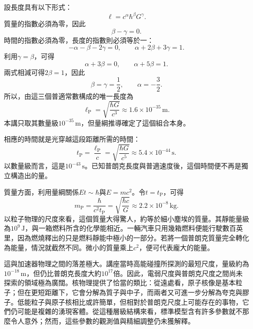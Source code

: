 設長度具有以下形式：
\begin{equation}
\ell=c^\alpha\hbar^\beta G^\gamma.
\label{eq:c10-length-ansatz}
\end{equation}
質量的指數必須為零，因此
\[
\beta-\gamma=0.
\]
時間的指數必須為零，長度的指數則必須等於一：
\[
-\alpha-\beta-2\gamma=0,
\qquad
\alpha+2\beta+3\gamma=1.
\]
利用\(\gamma=\beta\)，可得
\[
\alpha+3\beta=0,
\qquad
\alpha+5\beta=1.
\]
兩式相減可得\(2\beta=1\)，因此
\[
\beta=\gamma=\frac12,
\qquad
\alpha=-\frac32.
\]
所以，由這三個普適常數構成的唯一長度為
\begin{equation}
\ell_{\mathrm P}
=\sqrt{\frac{\hbar G}{c^3}}
\approx 1.6\times10^{-35}\,\mathrm m.
\label{eq:c10-planck-length}
\end{equation}
本講只取其數量級\(10^{-35}\,\mathrm m\)，但量綱推導確定了這個組合本身。

相應的時間就是光穿越這段距離所需的時間：
\begin{equation}
t_{\mathrm P}
=\frac{\ell_{\mathrm P}}{c}
=\sqrt{\frac{\hbar G}{c^5}}
\approx 5.4\times10^{-44}\,\mathrm s.
\label{eq:c10-planck-time}
\end{equation}
以數量級而言，這是\(10^{-43}\,\mathrm s\)。已知普朗克長度與普適速度後，這個時間便不再是獨立構造出的量。

質量方面，利用量綱關係\(Et\sim\hbar\)與\(E=mc^2\)。令\(t=t_{\mathrm P}\)，可得
\begin{equation}
m_{\mathrm P}
=\frac{\hbar}{c^2t_{\mathrm P}}
=\sqrt{\frac{\hbar c}{G}}
\approx 2.2\times10^{-8}\,\mathrm{kg}.
\label{eq:c10-planck-mass}
\end{equation}
以粒子物理的尺度來看，這個質量大得驚人，約等於細小塵埃的質量。其靜能量級為\(10^9\,\mathrm J\)，與一箱燃料所含的化學能相近。一輛汽車只用幾箱燃料便能行駛數百英里，因為燃燒釋出的只是燃料靜能中極小的一部分。若將一個普朗克質量完全轉化為能量，情況就截然不同。微小的質量乘上\(c^2\)，便可代表龐大的能量。

這與加速器物理之間的落差極大。講座當時高能碰撞所探測的最短尺度，量級約為\(10^{-18}\,\mathrm m\)，但仍比普朗克長度大約\(10^{17}\)倍。因此，電弱尺度與普朗克尺度之間尚未探索的領域極為廣闊。核物理提供了恰當的類比：從遠處看，原子核像是基本粒子；但在更短距離下，它會分解為質子與中子，而兩者又可進一步分解為夸克與膠子。低能粒子與原子核相比或許簡單，但相對於普朗克尺度上可能存在的事物，它們仍可能是複雜的湧現客體。從這種層級結構來看，標準模型含有許多參數就不那麼令人意外；然而，這些參數的觀測值與精細調整仍未獲解釋。

\begin{classroomqa}
\end{classroomqa}

